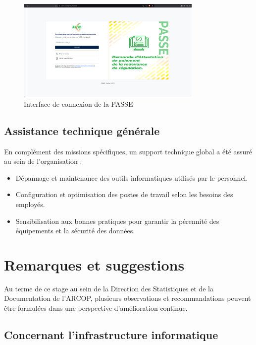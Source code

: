 \begin{figure}[H]
    \centering
    \includegraphics[width=0.8\textwidth]{images/passe/login.png}
    \caption{Interface de connexion de la \ac{PASSE}}
    \label{fig:interface-login_pass}
\end{figure}








\subsection{Assistance technique générale}
En complément des missions spécifiques, un support technique global a été assuré au sein de l’organisation :
\begin{itemize}
    \item Dépannage et maintenance des outils informatiques utilisés par le personnel.
    \item Configuration et optimisation des postes de travail selon les besoins des employés.
    \item Sensibilisation aux bonnes pratiques pour garantir la pérennité des équipements et la sécurité des données.
\end{itemize}
\section{Remarques et suggestions}

Au terme de ce stage au sein de la Direction des Statistiques et de la Documentation de l'ARCOP, plusieurs observations et recommandations peuvent être formulées dans une perspective d'amélioration continue.

\subsection{Concernant l'infrastructure informatique}


